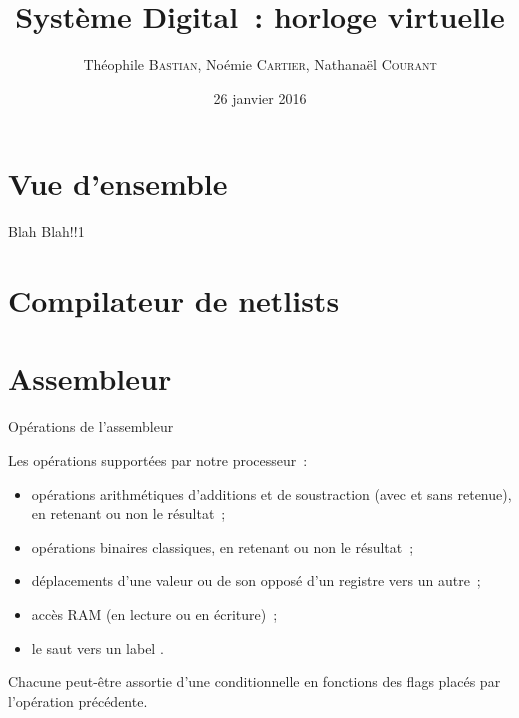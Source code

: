 \documentclass[11pt]{beamer}
\author{Théophile \textsc{Bastian}, Noémie \textsc{Cartier}, Nathanaël \textsc{Courant}}
\title{Système Digital~: horloge virtuelle}
\date{26 janvier 2016}
\begin{document}
\begin{frame}
\titlepage
\end{frame}


\section*{Vue d'ensemble}

\begin{frame}{Blah}
Blah!!1
\end{frame}


\begin{frame}
\tableofcontents
\end{frame}

\section{Compilateur de netlists}


\section{Assembleur}

\begin{frame}{Opérations de l'assembleur}

Les opérations supportées par notre processeur~:

\begin{itemize}
\item opérations arithmétiques d'additions et de soustraction (avec et sans retenue), en retenant ou non le résultat~;

\item opérations binaires classiques, en retenant ou non le résultat~;

\item déplacements d'une valeur ou de son opposé d'un registre vers un autre~;

\item accès RAM (en lecture ou en  écriture)~;

\item le saut vers un label .
\end{itemize}

Chacune peut-être assortie d'une conditionnelle en fonctions des flags placés par l'opération précédente.

\end{frame}
\end{document}
